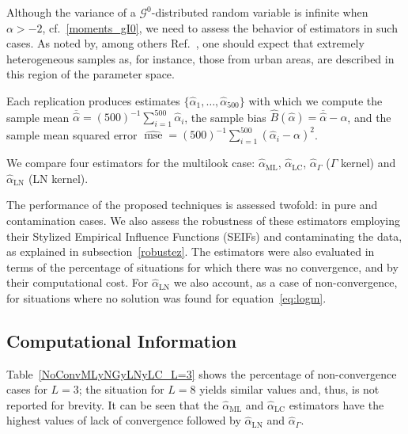 \documentclass[twocolumn]{svjour3}
\begin{document}
Although the variance of a $\mathcal{G}^0$-distributed random variable is infinite when $\alpha>-2$, cf.~\eqref{moments_gI0}, we need to assess the behavior of estimators in such cases.
As noted by, among others Ref.~\cite[Fig.~5]{LowCostRobustEstimationfortheSingleLookGI0ModelUsingtheParetoDistributioninpress}, one should expect that extremely heterogeneous samples as, for instance, those from urban areas, are described in this region of the parameter space.

Each replication produces estimates $\{\widehat{\alpha}_1, \dots, \widehat{\alpha}_{500}\}$ with which we compute 
the sample mean $\overline{\widehat{\alpha}}=(500)^{-1}{\sum_{i=1}^{500}{\widehat{\alpha}_i}}$, 
the sample bias $\widehat{B}(\widehat\alpha) = \overline{\widehat\alpha}- \alpha$, 
and 
the sample mean squared error $\widehat{\operatorname{mse}}=({500})^{-1}{\sum_{i=1}^{500}{(\widehat{\alpha}_i-\alpha)^2}}$.


We compare four estimators for the multilook case: 
$\widehat{\alpha}_{\text{{ML}}}$, 
$\widehat{\alpha}_{\text{{LC}}}$, 
$\widehat{\alpha}_{\Gamma}$ ($\Gamma$ kernel) and $\widehat{\alpha}_{\text{{LN}}}$ (LN kernel).

The performance of the proposed techniques is assessed twofold: in pure and contamination cases. 
We also assess the robustness of these estimators employing their Stylized Empirical Influence Functions (SEIFs) and contaminating the data, as explained in subsection~\ref{robustez}. 
The estimators were also evaluated in terms of the percentage of situations for which there was no convergence, and by their computational cost. 
For $\widehat{\alpha}_{\text{{LN}}}$ we also account, as a case of non-convergence, for situations where no solution was found for equation~\eqref{eq:logm}.


\subsection{Computational Information}

Table~\ref{NoConvMLyNGyLNyLC_L=3} shows the percentage of non-convergence cases for $L=3$; the situation for $L=8$ yields similar values and, thus, is not reported for brevity.
It can be seen that the $\widehat{\alpha}_{\text{{ML}}}$ and $\widehat{\alpha}_{\text{{LC}}}$ estimators have the highest values of lack of convergence followed by  $\widehat{\alpha}_{\text{{LN}}}$ and $\widehat{\alpha}_{\Gamma}$.
\end{document}
